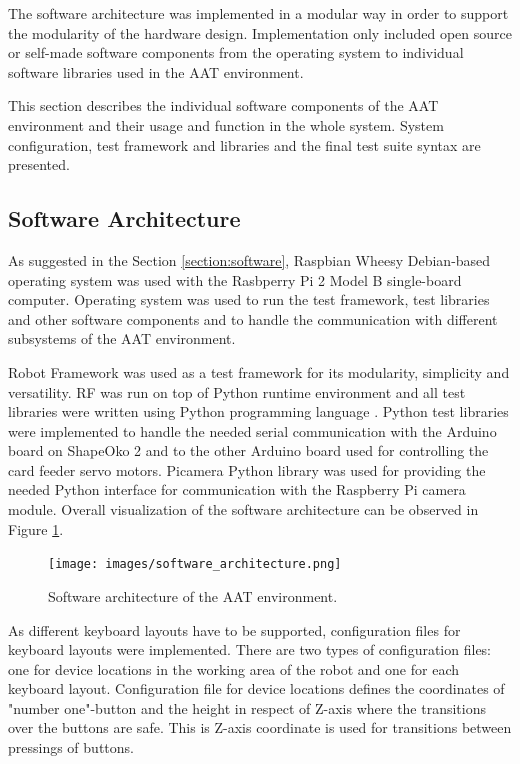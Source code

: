 The software architecture was implemented in a modular way in order to support the modularity of the hardware design. Implementation only included open source or self-made software components from the operating system to individual software libraries used in the AAT environment.

This section describes the individual software components of the AAT environment and their usage and function in the whole system. System configuration, test framework and libraries and the final test suite syntax are presented.

\subsection{Software Architecture}
\label{subsection:Software architecture}

As suggested in the Section \ref{section:software}, Raspbian Wheesy Debian-based operating system was used with the Rasbperry Pi 2 Model B single-board computer. Operating system was used to run the test framework, test libraries and other software components and to handle the communication with different subsystems of the AAT environment.

Robot Framework was used as a test framework for its modularity, simplicity and versatility. RF was run on top of Python runtime environment and all test libraries were written using Python programming language \citep{python}. Python test libraries were implemented to handle the needed serial communication with the Arduino board on ShapeOko 2 and to the other Arduino board used for controlling the card feeder servo motors. Picamera \citep{picamera} Python library was used for providing the needed Python interface for communication with the Raspberry Pi camera module. Overall visualization of the software architecture can be observed in Figure \ref{fig:software_architecture}.

\begin{figure}[ht]
  \begin{center}
    \texttt{[image: images/software\_architecture.png]}
    \caption{Software architecture of the AAT environment.}
    \label{fig:software_architecture}
  \end{center}
\end{figure}
\FloatBarrier

As different keyboard layouts have to be supported, configuration files for keyboard layouts were implemented. There are two types of configuration files: one for device locations in the working area of the robot and one for each keyboard layout. Configuration file for device locations defines the coordinates of "number one"-button and the height in respect of Z-axis where the transitions over the buttons are safe. This is Z-axis coordinate is used for transitions between pressings of buttons. 

